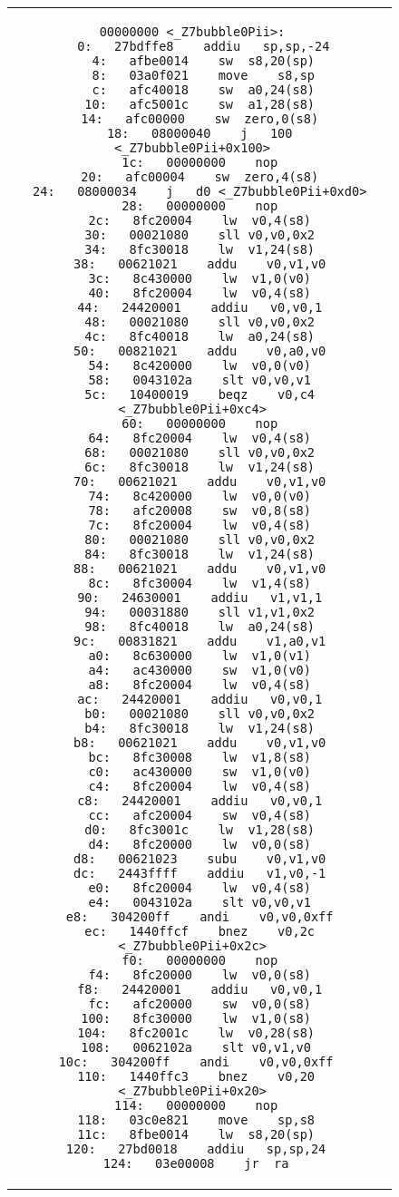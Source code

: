 \begin{figure}
\begin{center}
\begin{tabular}{c c}
	\begin{minipage}[t]{.4\textwidth}
		\begin{lstlisting}[language={[mips]Assembler},caption=bubble0,basicstyle=\ttfamily\tiny, tabsize=2]
00000000 <_Z7bubble0Pii>:
   0:	27bdffe8 	addiu	sp,sp,-24
   4:	afbe0014 	sw	s8,20(sp)
   8:	03a0f021 	move	s8,sp
   c:	afc40018 	sw	a0,24(s8)
  10:	afc5001c 	sw	a1,28(s8)
  14:	afc00000 	sw	zero,0(s8)
  18:	08000040 	j	100 <_Z7bubble0Pii+0x100>
  1c:	00000000 	nop
  20:	afc00004 	sw	zero,4(s8)
  24:	08000034 	j	d0 <_Z7bubble0Pii+0xd0>
  28:	00000000 	nop
  2c:	8fc20004 	lw	v0,4(s8)
  30:	00021080 	sll	v0,v0,0x2
  34:	8fc30018 	lw	v1,24(s8)
  38:	00621021 	addu	v0,v1,v0
  3c:	8c430000 	lw	v1,0(v0)
  40:	8fc20004 	lw	v0,4(s8)
  44:	24420001 	addiu	v0,v0,1
  48:	00021080 	sll	v0,v0,0x2
  4c:	8fc40018 	lw	a0,24(s8)
  50:	00821021 	addu	v0,a0,v0
  54:	8c420000 	lw	v0,0(v0)
  58:	0043102a 	slt	v0,v0,v1
  5c:	10400019 	beqz	v0,c4 <_Z7bubble0Pii+0xc4>
  60:	00000000 	nop
  64:	8fc20004 	lw	v0,4(s8)
  68:	00021080 	sll	v0,v0,0x2
  6c:	8fc30018 	lw	v1,24(s8)
  70:	00621021 	addu	v0,v1,v0
  74:	8c420000 	lw	v0,0(v0)
  78:	afc20008 	sw	v0,8(s8)
  7c:	8fc20004 	lw	v0,4(s8)
  80:	00021080 	sll	v0,v0,0x2
  84:	8fc30018 	lw	v1,24(s8)
  88:	00621021 	addu	v0,v1,v0
  8c:	8fc30004 	lw	v1,4(s8)
  90:	24630001 	addiu	v1,v1,1
  94:	00031880 	sll	v1,v1,0x2
  98:	8fc40018 	lw	a0,24(s8)
  9c:	00831821 	addu	v1,a0,v1
  a0:	8c630000 	lw	v1,0(v1)
  a4:	ac430000 	sw	v1,0(v0)
  a8:	8fc20004 	lw	v0,4(s8)
  ac:	24420001 	addiu	v0,v0,1
  b0:	00021080 	sll	v0,v0,0x2
  b4:	8fc30018 	lw	v1,24(s8)
  b8:	00621021 	addu	v0,v1,v0
  bc:	8fc30008 	lw	v1,8(s8)
  c0:	ac430000 	sw	v1,0(v0)
  c4:	8fc20004 	lw	v0,4(s8)
  c8:	24420001 	addiu	v0,v0,1
  cc:	afc20004 	sw	v0,4(s8)
  d0:	8fc3001c 	lw	v1,28(s8)
  d4:	8fc20000 	lw	v0,0(s8)
  d8:	00621023 	subu	v0,v1,v0
  dc:	2443ffff 	addiu	v1,v0,-1
  e0:	8fc20004 	lw	v0,4(s8)
  e4:	0043102a 	slt	v0,v0,v1
  e8:	304200ff 	andi	v0,v0,0xff
  ec:	1440ffcf 	bnez	v0,2c <_Z7bubble0Pii+0x2c>
  f0:	00000000 	nop
  f4:	8fc20000 	lw	v0,0(s8)
  f8:	24420001 	addiu	v0,v0,1
  fc:	afc20000 	sw	v0,0(s8)
 100:	8fc30000 	lw	v1,0(s8)
 104:	8fc2001c 	lw	v0,28(s8)
 108:	0062102a 	slt	v0,v1,v0
 10c:	304200ff 	andi	v0,v0,0xff
 110:	1440ffc3 	bnez	v0,20 <_Z7bubble0Pii+0x20>
 114:	00000000 	nop
 118:	03c0e821 	move	sp,s8
 11c:	8fbe0014 	lw	s8,20(sp)
 120:	27bd0018 	addiu	sp,sp,24
 124:	03e00008 	jr	ra

\end{lstlisting}
\end{minipage}
\end{tabular}
\end{center}
\end{figure}
